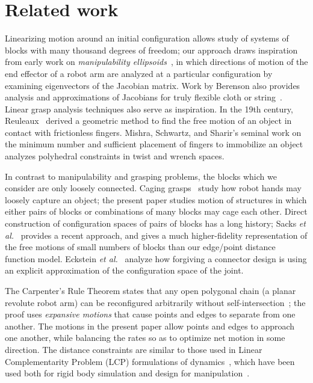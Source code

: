 \documentclass[11pt, twocolumn]{article}
\begin{document}
\section{Related work}





Linearizing motion around an initial configuration allows study of systems of blocks with many thousand degrees of freedom; our approach draws inspiration from early work on {\em manipulability ellipsoids}~\cite{Chiacchio1991-manipulability,Park1998-manipulability,Kim1998-manipulability,Bicchi2000-manipulability}, in which directions of motion of the end effector of a robot arm are analyzed at a particular configuration by examining eigenvectors of the Jacobian matrix. Work by Berenson also provides analysis and approximations of Jacobians for truly flexible cloth or string~\cite{Berenson2013-deformable}. Linear grasp analysis techniques also serve as inspiration. In the 19th century, Reuleaux~\cite{Reuleaux1876} derived a geometric method to find the free motion of an object in contact with frictionless fingers. Mishra, Schwartz, and Sharir's seminal work on the minimum number and sufficient placement of fingers to immobilize an object~\cite{Mishra1987-grasp-existence} analyzes polyhedral constraints in twist and wrench spaces.

In contrast to manipulability and grasping problems, the blocks which we consider are only loosely connected. Caging grasps~\cite{RodriguezMF12,makita2008,vahedi2008caging,erickson2003capturing,rimon1996caging,allen2015two,Makita2017-caging-survey} study how robot hands may loosely capture an object; the present paper studies motion of structures in which either pairs of blocks or combinations of many blocks may cage each other. Direct construction of configuration spaces of pairs of blocks has a long history; Sacks {\em et al.}~\cite{SacksBM17} provides a recent approach, and gives a much higher-fidelity representation of the free motions of small numbers of blocks than our edge/point distance function model. Eckstein {\em et al.}~\cite{Eckenstein2017-acceptance-area-connectors} analyze how forgiving a connector design is using an explicit approximation of the configuration space of the joint.

The Carpenter's Rule Theorem states that any open polygonal chain (a planar revolute robot arm) can be reconfigured arbitrarily without self-intersection~\cite{Connelly2003-carpenters}; the proof uses {\em expansive motions} that cause points and edges to separate from one another. The motions in the present paper allow points and edges to approach one another, while balancing the rates so as to optimize net motion in some direction. The distance constraints are similar to those used in Linear Complementarity Problem (LCP) formulations of dynamics~\cite{STsiam97,TTPrs01}, which have been used both for rigid body simulation and design for manipulation~\cite{Balkcom2002b}.
\end{document}

